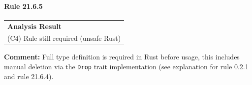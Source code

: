 \paragraph{Rule 21.6.5}
\begin{longtable}{p{13cm}}
\textbf{Analysis Result} \\
(C4) Rule still required (unsafe Rust) \\
\end{longtable}
\textbf{Comment:} Full type definition is required in Rust before usage, this includes manual deletion via the \texttt{Drop} trait implementation (see explanation for rule 0.2.1 and rule 21.6.4). \\
